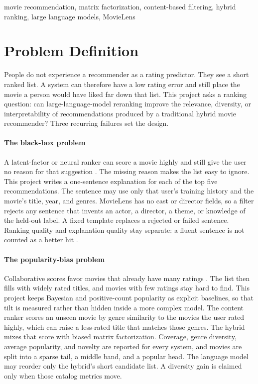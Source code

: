 \documentclass[conference]{IEEEtran}
\begin{document}
\begin{IEEEkeywords}
movie recommendation, matrix factorization, content-based filtering, hybrid ranking, large language models, MovieLens
\end{IEEEkeywords}

\section{Problem Definition}
People do not experience a recommender as a rating predictor. They see a short ranked list. A system can therefore have a low rating error and still place the movie a person would have liked far down that list. This project asks a ranking question: can large-language-model reranking improve the relevance, diversity, or interpretability of recommendations produced by a traditional hybrid movie recommender? Three recurring failures set the design.

\paragraph{The black-box problem}
A latent-factor or neural ranker can score a movie highly and still give the user no reason for that suggestion \cite{he2017,wu2024}. The missing reason makes the list easy to ignore. This project writes a one-sentence explanation for each of the top five recommendations. The sentence may use only that user's training history and the movie's title, year, and genres. MovieLens has no cast or director fields, so a filter rejects any sentence that invents an actor, a director, a theme, or knowledge of the held-out label. A fixed template replaces a rejected or failed sentence. Ranking quality and explanation quality stay separate: a fluent sentence is not counted as a better hit \cite{wu2024}.

\paragraph{The popularity-bias problem}
Collaborative scores favor movies that already have many ratings \cite{steck2011}. The list then fills with widely rated titles, and movies with few ratings stay hard to find. This project keeps Bayesian and positive-count popularity as explicit baselines, so that tilt is measured rather than hidden inside a more complex model. The content ranker scores an unseen movie by genre similarity to the movies the user rated highly, which can raise a less-rated title that matches those genres. The hybrid mixes that score with biased matrix factorization. Coverage, genre diversity, average popularity, and novelty are reported for every system, and movies are split into a sparse tail, a middle band, and a popular head. The language model may reorder only the hybrid's short candidate list. A diversity gain is claimed only when those catalog metrics move.
\end{document}
